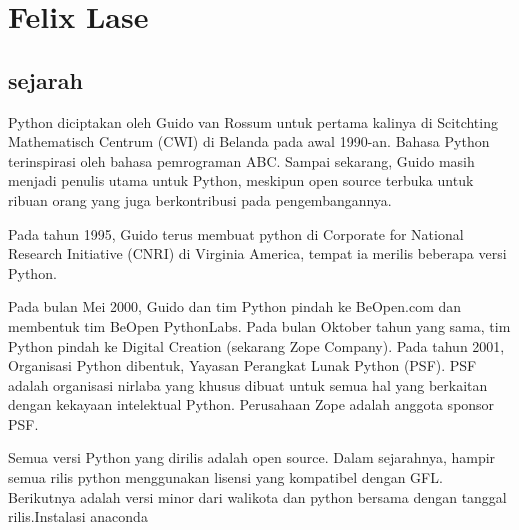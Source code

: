 
\section{Felix Lase}
\subsection{sejarah}
Python diciptakan oleh Guido van Rossum untuk pertama kalinya di Scitchting Mathematisch Centrum (CWI) di Belanda pada awal 1990-an. Bahasa Python terinspirasi oleh bahasa pemrograman ABC. Sampai sekarang, Guido masih menjadi penulis utama untuk Python, meskipun open source terbuka untuk ribuan orang yang juga berkontribusi pada pengembangannya.
\par
Pada tahun 1995, Guido terus membuat python di Corporate for National Research Initiative (CNRI) di Virginia America, tempat ia merilis beberapa versi Python.
\par
Pada bulan Mei 2000, Guido dan tim Python pindah ke BeOpen.com dan membentuk tim BeOpen PythonLabs. Pada bulan Oktober tahun yang sama, tim Python pindah ke Digital Creation (sekarang Zope Company). Pada tahun 2001, Organisasi Python dibentuk, Yayasan Perangkat Lunak Python (PSF). PSF adalah organisasi nirlaba yang khusus dibuat untuk semua hal yang berkaitan dengan kekayaan intelektual Python. Perusahaan Zope adalah anggota sponsor PSF.
\par
Semua versi Python yang dirilis adalah open source. Dalam sejarahnya, hampir semua rilis python menggunakan lisensi yang kompatibel dengan GFL. Berikutnya adalah versi minor dari walikota dan python bersama dengan tanggal rilis.Instalasi anaconda
